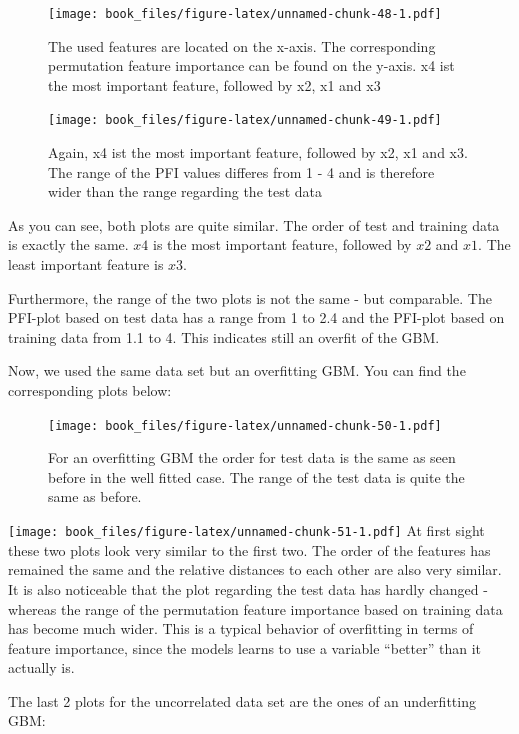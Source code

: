 \documentclass[]{krantz}
\begin{document}
\begin{figure}
\centering
\texttt{[image: book\_files/figure-latex/unnamed-chunk-48-1.pdf]}
\caption{\label{fig:unnamed-chunk-48}The used features are located on the
x-axis. The corresponding permutation feature importance can be found on
the y-axis. x4 ist the most important feature, followed by x2, x1 and
x3}
\end{figure}

\begin{figure}
\centering
\texttt{[image: book\_files/figure-latex/unnamed-chunk-49-1.pdf]}
\caption{\label{fig:unnamed-chunk-49}Again, x4 ist the most important
feature, followed by x2, x1 and x3. The range of the PFI values differes
from 1 - 4 and is therefore wider than the range regarding the test
data}
\end{figure}

As you can see, both plots are quite similar. The order of test and
training data is exactly the same. \(x4\) is the most important feature,
followed by \(x2\) and \(x1\). The least important feature is \(x3\).

Furthermore, the range of the two plots is not the same - but
comparable. The PFI-plot based on test data has a range from 1 to 2.4
and the PFI-plot based on training data from 1.1 to 4. This indicates
still an overfit of the GBM.

Now, we used the same data set but an overfitting GBM. You can find the
corresponding plots below:

\begin{figure}
\centering
\texttt{[image: book\_files/figure-latex/unnamed-chunk-50-1.pdf]}
\caption{\label{fig:unnamed-chunk-50}For an overfitting GBM the order for
test data is the same as seen before in the well fitted case. The range
of the test data is quite the same as before.}
\end{figure}

\texttt{[image: book\_files/figure-latex/unnamed-chunk-51-1.pdf]} At
first sight these two plots look very similar to the first two. The
order of the features has remained the same and the relative distances
to each other are also very similar. It is also noticeable that the plot
regarding the test data has hardly changed - whereas the range of the
permutation feature importance based on training data has become much
wider. This is a typical behavior of overfitting in terms of feature
importance, since the models learns to use a variable ``better'' than it
actually is.

The last 2 plots for the uncorrelated data set are the ones of an
underfitting GBM:
\end{document}
